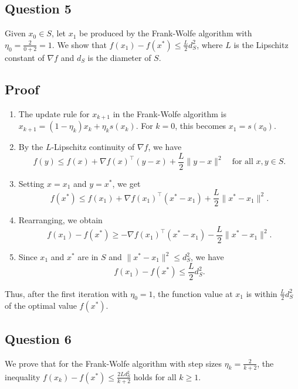 \documentclass[12p]{article}
\begin{document}
\subsection*{Question 5} 

Given \( x_0 \in S \), let \( x_1 \) be produced by the Frank-Wolfe algorithm with \( \eta_0 = \frac{2}{0+2} = 1 \). We show that \( f(x_1) - f(x^*) \leq \frac{L}{2} d_S^2 \), where \( L \) is the Lipschitz constant of \( \nabla f \) and \( d_S \) is the diameter of \( S \).

\subsection*{Proof}

\begin{enumerate}
    \item The update rule for \( x_{k+1} \) in the Frank-Wolfe algorithm is \( x_{k+1} = (1 - \eta_k) x_k + \eta_k s(x_k) \). For \( k = 0 \), this becomes \( x_1 = s(x_0) \).

    \item By the \( L \)-Lipschitz continuity of \( \nabla f \), we have
    \[ f(y) \leq f(x) + \nabla f(x)^\top (y - x) + \frac{L}{2} \|y - x\|^2 \quad \text{for all } x, y \in S. \]

    \item Setting \( x = x_1 \) and \( y = x^* \), we get
    \[ f(x^*) \leq f(x_1) + \nabla f(x_1)^\top (x^* - x_1) + \frac{L}{2} \|x^* - x_1\|^2. \]

    \item Rearranging, we obtain
    \[ f(x_1) - f(x^*) \geq - \nabla f(x_1)^\top (x^* - x_1) - \frac{L}{2} \|x^* - x_1\|^2. \]

    \item Since \( x_1 \) and \( x^* \) are in \( S \) and \( \|x^* - x_1\|^2 \leq d_S^2 \), we have
    \[ f(x_1) - f(x^*) \leq \frac{L}{2} d_S^2. \]
\end{enumerate}

Thus, after the first iteration with \( \eta_0 = 1 \), the function value at \( x_1 \) is within \( \frac{L}{2} d_S^2 \) of the optimal value \( f(x^*) \).



\subsection*{Question 6} 

We prove that for the Frank-Wolfe algorithm with step sizes \( \eta_k = \frac{2}{k+2} \), the inequality \( f(x_k) - f(x^*) \leq \frac{2Ld^2_S}{k+2} \) holds for all \( k \geq 1 \).
\end{document}
